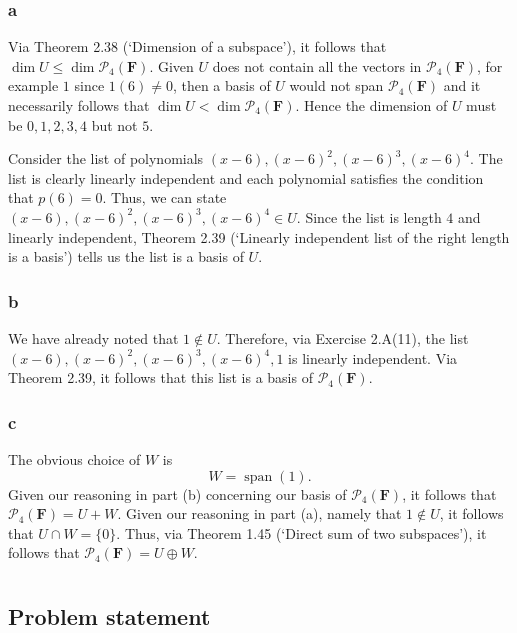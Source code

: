\documentclass{article}
\begin{document}
\subsubsection*{a}
Via Theorem 2.38 (`Dimension of a subspace'), it follows that\newline $\operatorname{dim}U\leq\operatorname{dim}\mathcal{P}_4(\mathbf{F})$.
Given $U$ does not contain all the vectors in $\mathcal{P}_4(\mathbf{F})$, for example $1$ since $1(6)\neq 0$, then a basis of $U$ would not span $\mathcal{P}_4(\mathbf{F})$ and it necessarily follows that $\operatorname{dim}U<\operatorname{dim}\mathcal{P}_4(\mathbf{F})$. 
Hence the dimension of $U$ must be $0,1,2,3,4$ but not $5$.

Consider the list of polynomials $(x-6),(x-6)^2,(x-6)^3,(x-6)^4$. 
The list is clearly linearly independent and each polynomial satisfies the condition that $p(6)=0$. 
Thus, we can state $(x-6),(x-6)^2,(x-6)^3,(x-6)^4\in U$. 
Since the list is length $4$ and linearly independent, Theorem 2.39 (`Linearly independent list of the right length is a basis') tells us the list is a basis of $U$. 

\subsubsection*{b}
We have already noted that $1\notin U$. 
Therefore, via Exercise 2.A(11), the list $(x-6),(x-6)^2,(x-6)^3,(x-6)^4,1$ is linearly independent. 
Via Theorem 2.39, it follows that this list is a basis of $\mathcal{P}_4(\mathbf{F})$.

\subsubsection*{c}
The obvious choice of $W$ is 
\[W=\operatorname{span}(1).\]
Given our reasoning in part (b) concerning our basis of $\mathcal{P}_4(\mathbf{F})$, it follows that $\mathcal{P}_4(\mathbf{F})=U + W$. 
Given our reasoning in part (a), namely that $1\notin U$, it follows that $U\cap W=\{0\}$. 
Thus, via Theorem 1.45 (`Direct sum of two subspaces'), it follows that $\mathcal{P}_4(\mathbf{F})=U\oplus W$.

\clearpage

\renewcommand{\thesection}{9}
\section{}
\subsection*{Problem statement}
\end{document}

